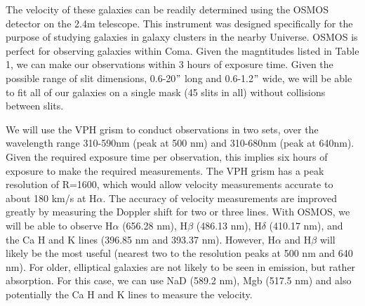 The velocity of these galaxies can be readily determined using the
OSMOS detector on the 2.4m telescope. This  instrument was designed specifically
for the purpose of studying galaxies in galaxy clusters in the nearby Universe.
OSMOS is perfect for observing galaxies within Coma. Given the magntitudes listed
in Table 1, we can make our observations within 3 hours of exposure time. 
Given the possible range
of slit dimensions, 0.6-20$"$ long and 0.6-1.2$"$ wide, we will be able to 
fit all of our galaxies on a single mask (45 slits in all) without collisions
between slits.

We will use the VPH grism to conduct observations in two sets, over the
wavelength range 310-590nm (peak at 500 nm) and 310-680nm (peak at 640nm). Given
the required exposure time per observation, this implies six hours of exposure
to make the required measurements. The VPH grism has a peak resolution of
R=1600, which would allow velocity measurements 
accurate to about 180 km/s at H$\alpha$. The accuracy of velocity measurements are improved
greatly by measuring the Doppler shift for two or three lines. With OSMOS,
we will be able to observe H$\alpha$ (656.28 nm), H$\beta$ (486.13 nm), H$\delta$
(410.17 nm), and the Ca H and K lines (396.85 nm and 393.37 nm). However,
H$\alpha$ and H$\beta$ will likely be the most useful (nearest two to the 
resolution peaks at 500 nm and 640 nm). For older, elliptical galaxies are not 
likely to be seen in emission, but rather absorption. For this case, we can
use NaD (589.2 nm), Mgb (517.5 nm) and also potentially the Ca H and K lines to
measure the velocity.



